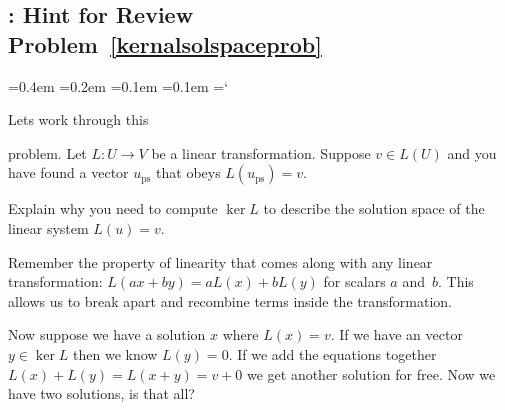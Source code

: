 
\subsection*{\leastSquaresTitle: Hint for Review Problem~\ref{kernalsolspaceprob}}

{\ttfamily
{}\font=0.4em
\font=0.2em
\font=0.1em
\font=0.1em
\hyphenchar\font=`\-


\hypertarget{scripts_least_squares_hint}{Lets work through this} problem. 
 Let $L:U\rightarrow V$ be a linear transformation.  Suppose $v\in L(U)$ and you have found a vector $u_{\mathrm{ps}}$ that obeys $L(u_{\mathrm{ps}})=v$.

Explain why you need to compute $\ker L$ to describe the solution space of the linear system $L(u)=v$.

Remember the property of linearity that comes along with any linear transformation: $L(ax+by) = aL(x) + bL(y)$ for scalars $a$ and~$b$. This allows us to break apart and recombine terms inside the transformation.

Now suppose we have a solution $x$ where $L(x)=v$. If we have an vector $y \in \ker{L}$ then we know $L(y)=0$. If we add the equations together $L(x)+  L(y) = L(x+ y)=v +0$ we get another solution for free. Now we have two solutions, is that all?



} %


